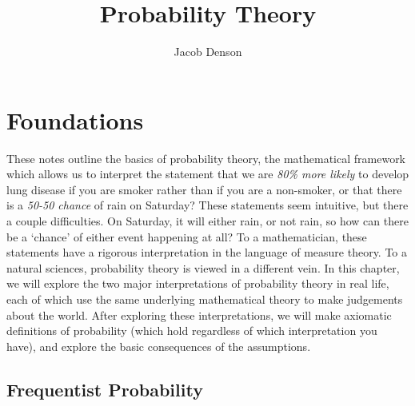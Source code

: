 

\title{Probability Theory}
\author{Jacob Denson}



\maketitle
\tableofcontents
{}

\chapter{Foundations}

These notes outline the basics of probability theory, the mathematical framework which allows us to interpret the statement that we are {\it 80\% more likely} to develop lung disease if you are smoker rather than if you are a non-smoker, or that there is a {\it 50-50 chance} of rain on Saturday? These statements seem intuitive, but there a couple difficulties. On Saturday, it will either rain, or not rain, so how can there be a `chance' of either event happening at all? To a mathematician, these statements have a rigorous interpretation in the language of measure theory. To a natural sciences, probability theory is viewed in a different vein. In this chapter, we will explore the two major interpretations of probability theory in real life, each of which use the same underlying mathematical theory to make judgements about the world. After exploring these interpretations, we will make axiomatic definitions of probability (which hold regardless of which interpretation you have), and explore the basic consequences of the assumptions.

\section{Frequentist Probability}

